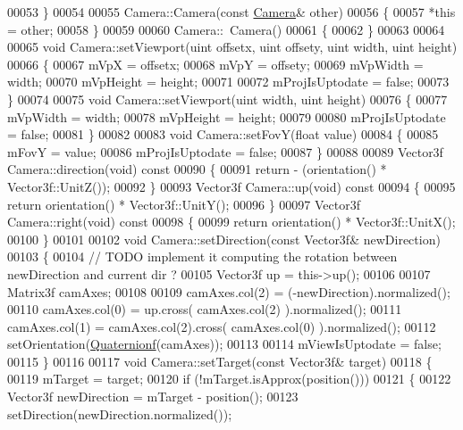 \begin{DoxyCode}
00053 \}
00054 
00055 Camera::Camera(\textcolor{keyword}{const} \hyperlink{class_camera}{Camera}& other)
00056 \{
00057     *\textcolor{keyword}{this} = other;
00058 \}
00059 
00060 Camera::~Camera()
00061 \{
00062 \}
00063 
00064 
00065 \textcolor{keywordtype}{void} Camera::setViewport(uint offsetx, uint offsety, uint width, uint height)
00066 \{
00067     mVpX = offsetx;
00068     mVpY = offsety;
00069     mVpWidth = width;
00070     mVpHeight = height;
00071     
00072     mProjIsUptodate = \textcolor{keyword}{false};
00073 \}
00074 
00075 \textcolor{keywordtype}{void} Camera::setViewport(uint width, uint height)
00076 \{
00077     mVpWidth = width;
00078     mVpHeight = height;
00079     
00080     mProjIsUptodate = \textcolor{keyword}{false};
00081 \}
00082 
00083 \textcolor{keywordtype}{void} Camera::setFovY(\textcolor{keywordtype}{float} value)
00084 \{
00085     mFovY = value;
00086     mProjIsUptodate = \textcolor{keyword}{false};
00087 \}
00088 
00089 Vector3f Camera::direction(\textcolor{keywordtype}{void})\textcolor{keyword}{ const}
00090 \textcolor{keyword}{}\{
00091     \textcolor{keywordflow}{return} - (orientation() * Vector3f::UnitZ());
00092 \}
00093 Vector3f Camera::up(\textcolor{keywordtype}{void})\textcolor{keyword}{ const}
00094 \textcolor{keyword}{}\{
00095     \textcolor{keywordflow}{return} orientation() * Vector3f::UnitY();
00096 \}
00097 Vector3f Camera::right(\textcolor{keywordtype}{void})\textcolor{keyword}{ const}
00098 \textcolor{keyword}{}\{
00099     \textcolor{keywordflow}{return} orientation() * Vector3f::UnitX();
00100 \}
00101 
00102 \textcolor{keywordtype}{void} Camera::setDirection(\textcolor{keyword}{const} Vector3f& newDirection)
00103 \{
00104     \textcolor{comment}{// TODO implement it computing the rotation between newDirection and current dir ?}
00105     Vector3f up = this->up();
00106     
00107     Matrix3f camAxes;
00108 
00109     camAxes.col(2) = (-newDirection).normalized();
00110     camAxes.col(0) = up.cross( camAxes.col(2) ).normalized();
00111     camAxes.col(1) = camAxes.col(2).cross( camAxes.col(0) ).normalized();
00112     setOrientation(\hyperlink{group___geometry___module_ga785b13a5a87f9bf55d4eba51ead2dcf0}{Quaternionf}(camAxes));
00113     
00114     mViewIsUptodate = \textcolor{keyword}{false};
00115 \}
00116 
00117 \textcolor{keywordtype}{void} Camera::setTarget(\textcolor{keyword}{const} Vector3f& target)
00118 \{
00119     mTarget = target;
00120     \textcolor{keywordflow}{if} (!mTarget.isApprox(position()))
00121     \{
00122         Vector3f newDirection = mTarget - position();
00123         setDirection(newDirection.normalized());

\end{DoxyCode}
